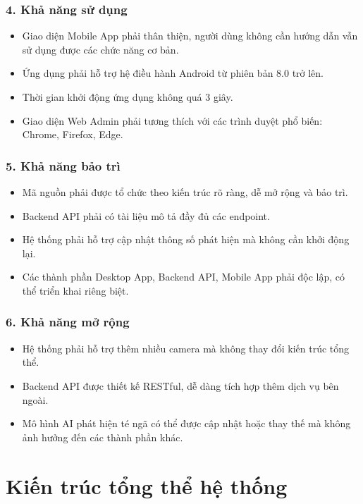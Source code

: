 \subsubsection*{4. Khả năng sử dụng}
\begin{itemize}[leftmargin=1.5cm]
  \item Giao diện Mobile App phải thân thiện, người dùng không
        cần hướng dẫn vẫn sử dụng được các chức năng cơ bản.
  \item Ứng dụng phải hỗ trợ hệ điều hành Android từ phiên bản
        8.0 trở lên.
  \item Thời gian khởi động ứng dụng không quá 3 giây.
  \item Giao diện Web Admin phải tương thích với các trình duyệt
        phổ biến: Chrome, Firefox, Edge.
\end{itemize}

\subsubsection*{5. Khả năng bảo trì}
\begin{itemize}[leftmargin=1.5cm]
  \item Mã nguồn phải được tổ chức theo kiến trúc rõ ràng, dễ
        mở rộng và bảo trì.
  \item Backend API phải có tài liệu mô tả đầy đủ các endpoint.
  \item Hệ thống phải hỗ trợ cập nhật thông số phát hiện mà không
        cần khởi động lại.
  \item Các thành phần Desktop App, Backend API, Mobile App phải
        độc lập, có thể triển khai riêng biệt.
\end{itemize}

\subsubsection*{6. Khả năng mở rộng}
\begin{itemize}[leftmargin=1.5cm]
  \item Hệ thống phải hỗ trợ thêm nhiều camera mà không thay đổi
        kiến trúc tổng thể.
  \item Backend API được thiết kế RESTful, dễ dàng tích hợp thêm
        dịch vụ bên ngoài.
  \item Mô hình AI phát hiện té ngã có thể được cập nhật hoặc
        thay thế mà không ảnh hưởng đến các thành phần khác.
\end{itemize}
\section{Kiến trúc tổng thể hệ thống}


